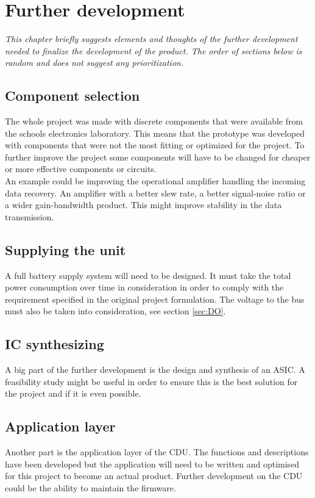 \chapter{Further development}
\textit{This chapter briefly suggests elements and thoughts of the further development needed to finalize the development of the product. The order of sections below is random and does not suggest any prioritization.}

\section{Component selection}
The whole project was made with discrete components that were available from the schools electronics laboratory. This means that the prototype was developed with components that were not the most fitting or optimized for the project. To further improve the project some components will have to be changed for cheaper or more effective components or circuits. \\
An example could be improving the operational amplifier handling the incoming data recovery. An amplifier with a better slew rate, a better signal-noise ratio or a wider gain-bandwidth product. This might improve stability in the data transmission.
\section{Supplying the unit}
A full battery supply system will need to be designed. It must take the total power consumption over time in consideration in order to comply with the requirement specified in the original project formulation. The voltage to the bus must also be taken into consideration, see section \ref{sec:DO}.
\section{IC synthesizing}
A big part of the further development is the design and synthesis of an ASIC. A feasibility study might be useful in order to ensure this is the best solution for the project and if it is even possible. 
\section{Application layer}
Another part is the application layer of the CDU. The functions and descriptions have been developed but the application will need to be written and optimised for this project to become an actual product. Further development on the CDU could be the ability to maintain the firmware.

